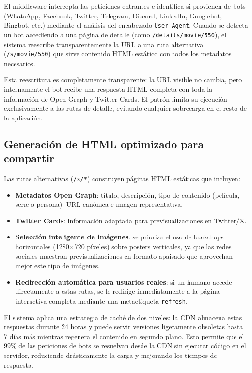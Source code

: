 El middleware intercepta las peticiones entrantes e identifica si provienen de bots (WhatsApp, Facebook, Twitter, Telegram, Discord, LinkedIn, Googlebot, Bingbot, etc.) mediante el análisis del encabezado \texttt{User-Agent}. Cuando se detecta un bot accediendo a una página de detalle (como \texttt{/details/movie/550}), el sistema reescribe transparentemente la URL a una ruta alternativa (\texttt{/s/movie/550}) que sirve contenido HTML estático con todos los metadatos necesarios.

Esta reescritura es completamente transparente: la URL visible no cambia, pero internamente el bot recibe una respuesta HTML completa con toda la información de Open Graph y Twitter Cards. El patrón limita su ejecución exclusivamente a las rutas de detalle, evitando cualquier sobrecarga en el resto de la aplicación.

\subsection{Generación de HTML optimizado para compartir}

Las rutas alternativas (\texttt{/s/*}) construyen páginas HTML estáticas que incluyen:

\begin{itemize}
\item \textbf{Metadatos Open Graph}: título, descripción, tipo de contenido (película, serie o persona), URL canónica e imagen representativa.
\item \textbf{Twitter Cards}: información adaptada para previsualizaciones en Twitter/X.
\item \textbf{Selección inteligente de imágenes}: se prioriza el uso de backdrops horizontales (1280$\times$720 píxeles) sobre posters verticales, ya que las redes sociales muestran previsualizaciones en formato apaisado que aprovechan mejor este tipo de imágenes.
\item \textbf{Redirección automática para usuarios reales}: si un humano accede directamente a estas rutas, se le redirige inmediatamente a la página interactiva completa mediante una metaetiqueta \texttt{refresh}.
\end{itemize}

El sistema aplica una estrategia de caché de dos niveles: la CDN almacena estas respuestas durante 24 horas y puede servir versiones ligeramente obsoletas hasta 7 días más mientras regenera el contenido en segundo plano. Esto permite que el 99\% de las peticiones de bots se resuelvan desde la CDN sin ejecutar código en el servidor, reduciendo drásticamente la carga y mejorando los tiempos de respuesta.

